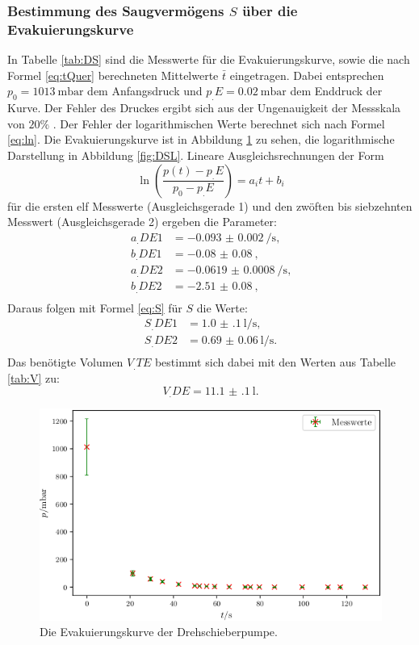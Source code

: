 \subsubsection{Bestimmung des Saugvermögens $S$ über die Evakuierungskurve}

In Tabelle \ref{tab:DS} sind die Messwerte für die Evakuierungskurve, sowie die nach Formel \eqref{eq:tQuer} berechneten Mittelwerte $\bar{t}$ eingetragen.
Dabei entsprechen $p_0=\SI{1013}{\milli\bar}$ dem Anfangsdruck und $p_.E=\SI{0.02}{\milli\bar}$ dem Enddruck der Kurve. Der Fehler des Druckes ergibt sich aus der Ungenauigkeit der Messskala von $20\%$ \cite{V70}. 
Der Fehler der logarithmischen Werte berechnet sich nach Formel \eqref{eq:ln}.
Die Evakuierungskurve ist in Abbildung \ref{fig:DSE} zu sehen, die logarithmische Darstellung in Abbildung \ref{fig:DSL}.
Lineare Ausgleichsrechnungen der Form
\[
\ln\left(\frac{p(t)-p_.E}{p_0-p_.E}\right) = a_it+b_i
\]
für die ersten elf Messwerte (Ausgleichsgerade 1) und den zwöften bis siebzehnten Messwert (Ausgleichsgerade 2) ergeben die Parameter:
\begin{align*}
a_.{DE1} &= \SI{-0.093(2)}{\per\second} \text{,}\\
b_.{DE1} &= \SI{-0.08(8)}{} \text{,}\\
a_.{DE2} &= \SI{-0.0619(8)}{\per\second} \text{,}\\
b_.{DE2} &= \SI{-2.51(8)}{} \text{,}\\
\end{align*} 
Daraus folgen mit Formel \eqref{eq:S} für $S$ die Werte:
\begin{align*}
S_.{DE1} &= \SI{1.0(1)}{\litre\per\second} \text{,}\\
S_.{DE2} &= \SI{0.69(6)}{\litre\per\second} \text{.}\\
\end{align*} 
Das benötigte Volumen $V_.{TE}$ bestimmt sich dabei mit den Werten aus Tabelle \ref{tab:V} zu:
\[
V_.{DE} = \SI{11.1(1)}{\litre}\text{.}
\]

\begin{figure}
\centering
\includegraphics[width=\linewidth-70pt,height=\textheight-70pt,keepaspectratio]{content/images/DSE.png}
\caption{Die Evakuierungskurve der Drehschieberpumpe.}
\label{fig:DSE}
\end{figure}

